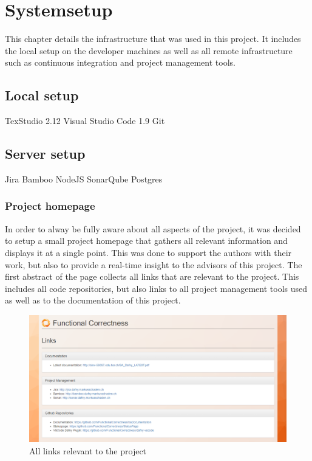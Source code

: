 \section{Systemsetup}
This chapter details the infrastructure that was used in this project. It includes the local setup on the developer machines as well as all remote infrastructure such as continuous integration and project management tools. 
\subsection{Local setup}
TexStudio 2.12\newline
Visual Studio Code 1.9\newline
Git 


\subsection{Server setup}
Jira \newline
Bamboo\newline
NodeJS\newline
SonarQube\newline
Postgres

\subsubsection{Project homepage}
In order to alway be fully aware about all aspects of the project, it was decided to setup a small project homepage that gathers all relevant information and displays it at a single point. This was done to support the authors with their work, but also to provide a real-time insight to the advisors of this project. \newline
The first abstract of the page collects all links that are relevant to the project. This includes all code repositories, but also links to all project management tools used as well as to the documentation of this project.  \newline
\begin{figure}[H]
	\centering
	\includegraphics[width=1\textwidth]{img/homeLinks}
	\caption{All links relevant to the project}
	\label{fig:Project Links}
\end{figure}

